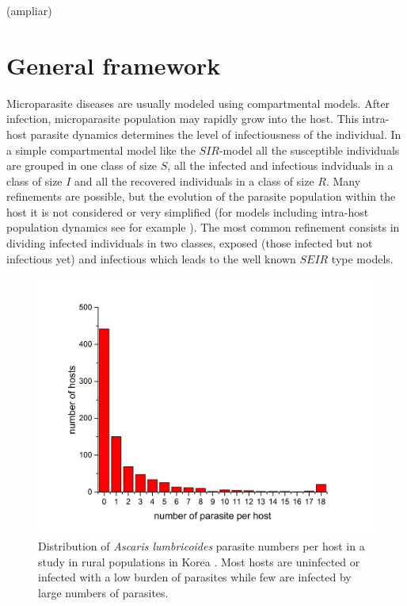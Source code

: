 \documentclass[eng]{MMSB-class-eng}
\begin{document}
{\color{blue}(ampliar)}

\section{General framework}

Microparasite diseases are usually modeled using compartmental models. After infection,  microparasite population may rapidly grow into the host. This intra-host parasite dynamics determines the level of infectiousness of the individual. In a simple compartmental  model like the $SIR$-model  all the susceptible individuals are grouped in one class of size $S$, all the infected and infectious indviduals in a class of size $I$ and all the recovered individuals in a class of size $R$. Many refinements are possible, but the evolution of the parasite population within the host it is not considered or very simplified (for models including intra-host population dynamics 
see for example \citet{gandolfi2015epidemic}).
The most common refinement consists in dividing infected individuals in two classes, exposed (those infected but not infectious yet) and infectious which leads to the well known $SEIR$ type models. 

\begin{figure}[!tb]
	\centering
	\includegraphics[width=0.99\linewidth]{dataseo}
	\caption{Distribution of \textit{Ascaris lumbricoides} parasite numbers per host in a study in rural populations in Korea \citep{seo1979frequency}. Most hosts are uninfected or infected with a low burden of parasites while few are infected by large numbers of parasites.}
	\label{fig:dataseo}
\end{figure}
\end{document}

